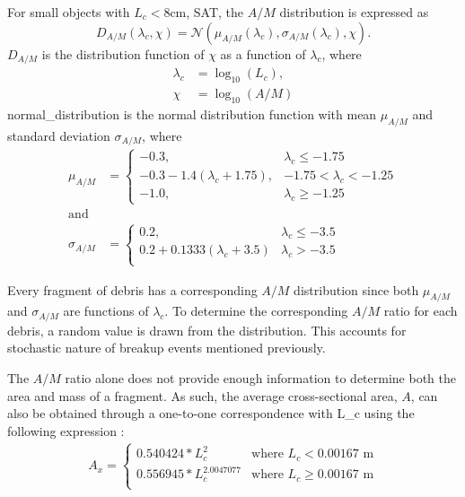 \documentclass[a4paper, 12pt]{article}
\begin{document}
For small objects with $L_c < 8$cm, SAT, the $A/M$ distribution is expressed as
\begin{equation}
	D_{A/M}(\lambda_c, \chi) = \mathcal{N}(\mu_{A/M}(\lambda_c), \sigma_{A/M}(\lambda_c), \chi).
\end{equation}
$D_{A/M}$ is the distribution function of $\chi$ as a function of $\lambda_c$, where
\begin{align}
	\lambda_c &= \log_{10}(L_c),\\
	\chi &= \log_{10}(A/M)
\end{align}
\Gls{normal_distribution} is the normal distribution function with mean $\mu_{A/M}$ and standard deviation $\sigma_{A/M}$, where
\begin{align}
	 \mu_{A/M} &= \begin{cases} 
		-0.3, & \lambda_c\leq -1.75 \\
		-0.3 - 1.4(\lambda_c + 1.75), & -1.75 < \lambda_c <-1.25 \\
		-1.0, & \lambda_c \geq -1.25 
	\end{cases}\\
	\text{and}\\
	\sigma_{A/M} &= \begin{cases} 
		0.2, & \lambda_c \leq -3.5 \\
		0.2 + 0.1333(\lambda_c + 3.5) & \lambda_c > -3.5 \\
	\end{cases}
\end{align}

Every fragment of debris has a corresponding $A/M$ distribution since both $\mu_{A/M}$ and $\sigma_{A/M}$ are functions of $\lambda_c$. To determine the corresponding $A/M$ ratio for each debris, a random value is drawn from the distribution. This accounts for stochastic nature of breakup events mentioned previously. 

The $A/M$ ratio alone does not provide enough information to determine both the area and mass of a fragment. As such, the average cross-sectional area, $A$, can also be obtained through a one-to-one correspondence with \Gls{L_c} using the following expression \citep{johnson_nasas_2001}:
\begin{align}
	A_x = \begin{cases}
		0.540424 * L_c^2 & \text{where } L_c < 0.00167 \text{ m} \\
		0.556945 * L_c^{2.0047077} & \text{where } L_c \geq 0.00167 \text{ m} \\
	\end{cases}
\end{align}
\end{document}
